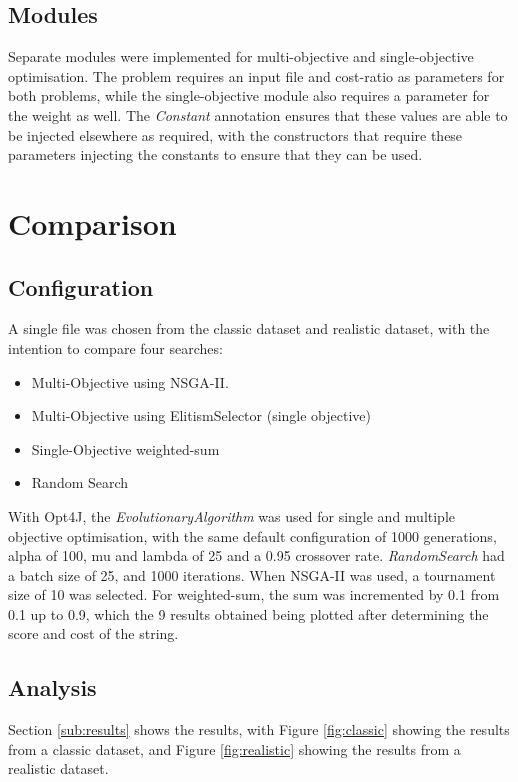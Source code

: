 \documentclass[11pt, a4paper]{article}
\begin{document}
\subsection{Modules} %
\label{sub:modules}
Separate modules were implemented for multi-objective and single-objective
optimisation. The problem requires an input file and cost-ratio as parameters
for both problems, while the single-objective module also requires a parameter
for the weight as well. The \emph{Constant} annotation ensures that these values
are able to be injected elsewhere as required, with the constructors that
require these parameters injecting the constants to ensure that they can be
used.

\section{Comparison}
\label{sec:comparison}

\subsection{Configuration} %
\label{sub:configuration}
A single file was chosen from the classic dataset and realistic dataset, with
the intention to compare four searches:
\begin{itemize}
    \item Multi-Objective using NSGA-II.
    \item Multi-Objective using ElitismSelector (single objective)
    \item Single-Objective weighted-sum
    \item Random Search
\end{itemize}

With Opt4J, the \emph{EvolutionaryAlgorithm} was used for single and multiple
objective optimisation, with the same default configuration of 1000 generations,
alpha of 100, mu and lambda of 25 and a 0.95 crossover rate. \emph{RandomSearch}
had a batch size of 25, and 1000 iterations. When NSGA-II was used, a tournament
size of 10 was selected. For weighted-sum, the sum was incremented by 0.1 from
0.1 up to 0.9, which the 9 results obtained being plotted after determining the
score and cost of the string.

\subsection{Analysis} %
\label{sub:analysis}
Section \ref{sub:results} shows the results, with Figure \ref{fig:classic}
showing the results from a classic dataset, and Figure \ref{fig:realistic} 
showing the results from a realistic dataset.
\end{document}
